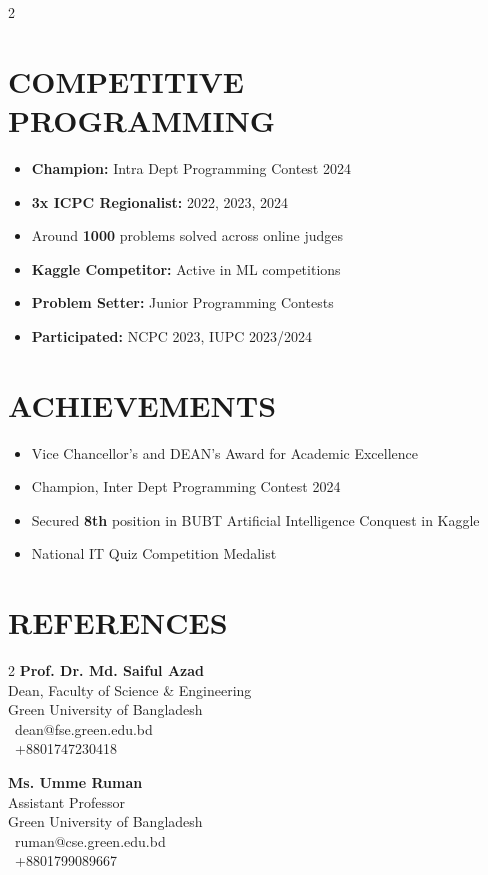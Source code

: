 \documentclass[a4paper,10pt]{article}
\begin{document}
\begin{multicols}{2}
\section*{COMPETITIVE PROGRAMMING}
\begin{itemize}
    \item \textbf{Champion:} Intra Dept Programming Contest 2024
    \item \textbf{3x ICPC Regionalist:} 2022, 2023, 2024
    \item Around \textbf{1000} problems solved across online judges
    \item \textbf{Kaggle Competitor:} Active in ML competitions
    \item \textbf{Problem Setter:} Junior Programming Contests
    \item \textbf{Participated:} NCPC 2023, IUPC 2023/2024
\end{itemize}
\columnbreak
\section*{ACHIEVEMENTS}
\begin{itemize}
    \item Vice Chancellor's and DEAN's Award for Academic Excellence
    \item Champion, Inter Dept Programming Contest 2024
    \item Secured \textbf{8th} position in BUBT Artificial Intelligence Conquest in Kaggle
    \item National IT Quiz Competition Medalist
\end{itemize}
\end{multicols}

\vspace{-0.2cm}

\section*{REFERENCES}
\vspace{-0.3cm}
\begin{multicols}{2}
\textbf{Prof. Dr. Md. Saiful Azad}\\
Dean, Faculty of Science \& Engineering\\
Green University of Bangladesh\\
\faEnvelope\ dean@fse.green.edu.bd\\
\faPhone\ +8801747230418\\[0.15em]

\columnbreak

\textbf{Ms. Umme Ruman}\\
Assistant Professor\\
Green University of Bangladesh\\
\faEnvelope\ ruman@cse.green.edu.bd\\
\faPhone\ +8801799089667
\end{multicols}
\end{document}
